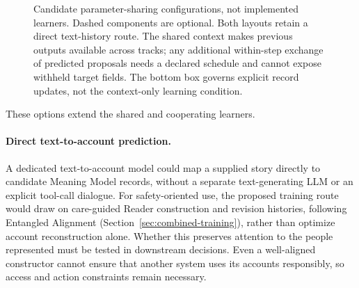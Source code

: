 \documentclass[10pt]{article}
\begin{document}
\begin{figure}[!htbp]
\caption{Candidate parameter-sharing configurations, not implemented learners.
Dashed components are optional. Both layouts retain a direct text-history
route. The shared context makes previous outputs available across tracks;
any additional within-step exchange of predicted proposals needs a declared
schedule and cannot expose withheld target fields. The bottom box governs
explicit record updates, not the context-only learning condition.}
\label{fig:learner-architectures}
\end{figure}

These options extend the shared and cooperating learners.

\paragraph{Direct text-to-account prediction.}
A dedicated text-to-account model could map a supplied story directly to
candidate Meaning Model records, without a separate text-generating LLM or an
explicit tool-call dialogue. For safety-oriented use, the proposed training
route would draw on care-guided Reader construction and revision histories,
following Entangled Alignment (Section~\ref{sec:combined-training}), rather
than optimize account reconstruction alone. Whether this preserves attention
to the people represented must be tested in downstream decisions. Even a
well-aligned constructor cannot ensure that another system uses its accounts
responsibly, so access and action constraints remain necessary.
\end{document}
